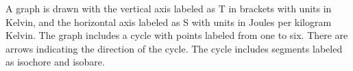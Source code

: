 A graph is drawn with the vertical axis labeled as T in brackets with units in Kelvin, and the horizontal axis labeled as S with units in Joules per kilogram Kelvin. The graph includes a cycle with points labeled from one to six. There are arrows indicating the direction of the cycle. The cycle includes segments labeled as isochore and isobare.